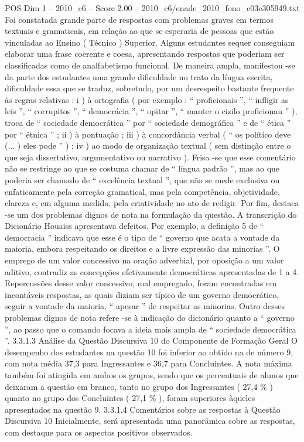 \begin{textsample}{POS Dim 1 – 2010\_c6 – Score 2.00 – 2010\_c6/enade\_2010\_fono\_c03e305949.txt}
Foi constatada grande parte de respostas com problemas graves em termos textuais e gramaticais, em relação ao que se esperaria de pessoas que estão vinculadas ao Ensino ( Técnico ) Superior.
Alguns estudantes sequer conseguiam elaborar uma frase coerente e coesa, apresentando respostas que poderiam ser classificadas como de analfabetismo funcional.
De maneira ampla, manifestou -se da parte dos estudantes uma grande dificuldade no trato da língua escrita, dificuldade essa que se traduz, sobretudo, por um desrespeito bastante frequente às regras relativas : i ) à ortografia ( por exemplo : “ proficionais ”, “ infligir as leis ”, “ corrupitos ”, “ democrácia ”, “ opitar ”, “ manter o cizilo proficionau ” ), troca de “ sociedade democrática ” por “ sociedade demográfica ” e de “ ética ” por “ étnica ” ; ii ) à pontuação ; iii ) à concordância verbal ( “ os político deve (... ) eles pode ” ) ; iv ) ao modo de organização textual ( sem distinção entre o que seja dissertativo, argumentativo ou narrativo ).
Frisa -se que esse comentário não se restringe ao que se costuma chamar de “ língua padrão ”, mas ao que poderia ser chamado de “ excelência textual ”, que não se mede exclusiva ou enfaticamente pela correção gramatical, mas pela competência, objetividade, clareza e, em alguma medida, pela criatividade no ato de redigir.
Por fim, destaca -se um dos problemas dignos de nota na formulação da questão.
A transcrição do Dicionário Houaiss apresentava defeitos.
Por exemplo, a definição 5 de “ democracia ” indicava que esse é o tipo de “ governo que acata a vontade da maioria, embora respeitando os direitos e a livre expressão das minorias ”.
O emprego de um valor concessivo na oração adverbial, por oposição a um valor aditivo, contradiz as concepções efetivamente democráticas apresentadas de 1 a 4.
Repercussões desse valor concessivo, mal empregado, foram encontradas em incontáveis respostas, as quais diziam ser típico de um governo democrático, seguir a vontade da maioria, “ apesar ” de respeitar as minorias.
Outro desses problemas dignos de nota refere -se à indicação do dicionário quanto a “ governo ”, ao passo que o comando focava a ideia mais ampla de “ sociedade democrática ”. 3.3.1.3 Análise da Questão Discursiva 10 do Componente de Formação Geral O desempenho dos estudantes na questão 10 foi inferior ao obtido na de número 9, com nota média 37,3 para Ingressantes e 36,7 para Concluintes.
A nota máxima também foi atingida em ambos os grupos, sendo que os percentuais de alunos que deixaram a questão em branco, tanto no grupo dos Ingressantes ( 27,4 \% ) quanto no grupo dos Concluintes ( 27,1 \% ), foram superiores àqueles apresentados na questão 9. 3.3.1.4 Comentários sobre as respostas à Questão Discursiva 10 Inicialmente, será apresentada uma panorâmica sobre as respostas, com destaque para os aspectos positivos observados.

\end{textsample}
